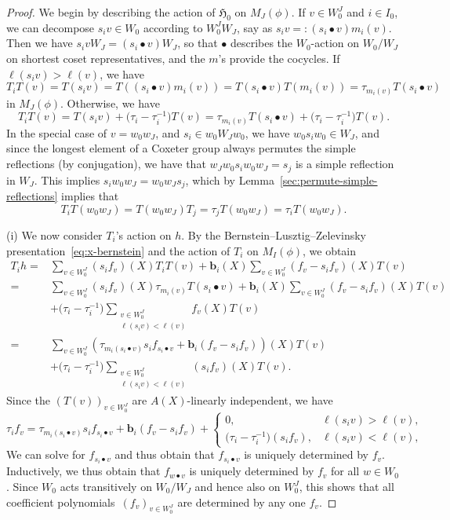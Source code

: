 \documentclass[10pt,a4paper]{amsart}
\theoremstyle{definition}
\numberwithin{equation}{section}
\begin{document}
\begin{proof}
 We begin by describing the action of $\mathfrak{H}_0$ on $M_J(\phi)$.
 If $v\in W_0^J$ and $i\in I_0$, we can decompose $s_iv\in W_0$ according
 to $W_0^J W_J$, say as
$s_i v =: (s_i\bullet v) m_i(v)$.
 Then we have $s_i vW_J= (s_i\bullet v)W_J$, so that $\bullet$ describes
 the $W_0$-action on $W_0/W_J$ on shortest coset representatives,
 and the $m$'s provide the cocycles. If $\ell(s_iv)>\ell(v)$, we have
 \[
 T_i T(v) = T(s_iv) = T((s_i\bullet v) m_i(v))
 = T(s_i\bullet v) T(m_i(v))
 = \tau_{m_i(v)} T(s_i\bullet v)
 \]
 in $M_J(\phi)$. Otherwise, we have
 \[
 T_i T(v) = T(s_iv) + \bigl(\tau_i - \tau_i^{-1}\bigr)
 T(v)
 = \tau_{m_i(v)} T(s_i\bullet v)
 + \bigl(\tau_i - \tau_i^{-1}\bigr) T(v).
 \]
 In the special case of $v=w_0w_J$, and $s_i\in w_0W_Jw_0$, we have
 $w_0 s_i w_0\in W_J$, and since the longest element of a Coxeter group
 always permutes the simple reflections (by conjugation), we have that
 $w_J w_0 s_i w_0 w_J = s_j$ is a simple reflection in $W_J$. This implies
$
 s_i w_0 w_J = w_0 w_J s_j$,
 which by Lemma~\ref{sec:permute-simple-reflections} implies that
 \[
 T_i T(w_0w_J) = T(w_0w_J) T_j = \tau_j T(w_0w_J)
 = \tau_i T(w_0w_J).
 \]

(i) We now consider $T_i$'s action on $h$. By the Bernstein--Lusztig--Zelevinsky
 presentation~\eqref{eq:x-bernstein} and the action of $T_i$ on $M_I(\phi)$, we obtain
 \begin{align*}
 T_i h ={}& \sum_{v\in W_0^J} (s_i f_v)(X) T_i T(v)
 + \bm{b}_i(X) \sum_{v\in W_0^J} (f_v-s_if_v)(X) T(v)\\
 ={}& \sum_{v\in W_0^J} (s_i f_v)(X) \tau_{m_i(v)} T(s_i\bullet v)
 + \bm{b}_i(X) \sum_{v\in W_0^J} (f_v-s_if_v)(X) T(v)\\
 &+ \bigl(\tau_i-\tau_i^{-1}\bigr)\sum_{\substack{v\in W_0^J\\\ell(s_iv)<\ell(v)}} f_v(X) T(v)\\
 ={}& \sum_{v\in W_0^J} (\tau_{m_i(s_i\bullet v)} s_i f_{s_i\bullet v} + \bm{b}_i (f_v-s_if_v))(X) T(v)\\
 &+ \bigl(\tau_i-\tau_i^{-1}\bigr)\sum_{\substack{v\in W_0^J\\\ell(s_iv)<\ell(v)}} (s_if_v)(X) T(v).
 \end{align*}
 Since the $(T(v))_{v\in W_0^J}$ are $A(X)$-linearly independent, we have
 \[
 \tau_i f_v = \tau_{m_i(s_i\bullet v)}
 s_i f_{s_i\bullet v} + \bm{b}_i(f_v-s_if_v)
 + \begin{cases}
 0, & \ell(s_iv)>\ell(v),\\
 \bigl(\tau_i-\tau_i^{-1}\bigr)(s_if_v), & \ell(s_iv)<\ell(v),
 \end{cases}
 \]
 We can solve for $f_{s_i\bullet v}$ and thus obtain that
 $f_{s_i\bullet v}$ is uniquely determined by $f_v$. Inductively, we thus
 obtain that $f_{w\bullet v}$ is uniquely determined by $f_v$ for all
 $w\in W_0$. Since $W_0$ acts transitively on $W_0/W_J$ and hence also
 on $W_0^J$, this shows that all coefficient polynomials~$(f_v)_{v\in W_0^J}$ are
 determined by any one $f_v$.


\end{proof}
\end{document}
